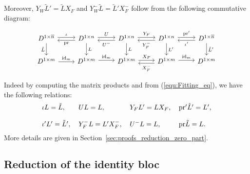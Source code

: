 \documentclass{ifacconf}
\newcommand\id[1]{\text{id}_{#1}}
\newcommand\p{\text{pr}}
\begin{document}
\begin{pf}
  Moreover, $Y_W\tilde{L}'=\tilde{L}X_F$ and $Y_W^-\tilde{L}=\tilde{L}'
  X_F^-$ follow from the following commutative diagram:
  \vspace{-0.4cm}
  \begin{small}
    \begin{center}
      \begin{equation}\label{equ:main_commutative_diagram_zero_part}
        \begin{tikzcd}
          D^{1\times\overline{n}}\arrow[d, "\tilde{L}"']\arrow[r, "\iota", shift right=-0.5ex] &
          D^{1\times n}\arrow[d, "L"]\arrow[r, "U", shift right=-0.5ex]
          \arrow[l, "\p", shift left=0.5ex] &
          D^{1\times n}\arrow[d, "L"]\arrow[r, "Y_F", shift right=-0.5ex] 
          \arrow[l, "U^-", shift right=-0.5ex] &
          D^{1\times n}\arrow[d, "L'"]\arrow[r, "\p'", shift right=-0.5ex] 
          \arrow[l, "Y_F^-", shift right=-0.5ex] &
          D^{1\times\overline{n}}\arrow[d, "\tilde{L}'"]
          \arrow[l, "\iota'", shift right=-0.5ex] 
          \\
          D^{1\times m}\arrow[r, "\id{m}"] &
          D^{1\times m}\arrow[r, "\id{m}", shift right=-0.5ex]
          &
          D^{1\times m}\arrow[r, "X_F", shift right=-0.5ex]
          &
          D^{1\times m}\arrow[r, "\id{m}", shift right=-0.5ex]
          \arrow[l, "X_F^-", shift right=-0.5ex] &
          D^{1\times m}
        \end{tikzcd}
      \end{equation}
    \end{center}
  \end{small}
  Indeed by computing the matrix products and
  from (\ref{equ:Fitting_eq}), we have the following relations:
  \begin{equation}
    \label{eq:formulas_reduction_zero_part}
    \begin{tabular}{l l l l}
      $\iota L=\tilde{L},$ & $UL=L,$ & $Y_FL'=LX_F$, & $\p'\tilde{L}'=L'$,\\
      & & \\
      $\iota'L'=\tilde{L}',$ & $Y_F^-L=L'X_F^-,$ & $U^-L=L$, & $\p\tilde{L}
      =L$.
    \end{tabular}
  \end{equation}
  More details are given in Section~\ref{sec:proofs_reduction_zero_part}.

\end{pf}

\subsection{Reduction of the identity bloc}


\end{document}
